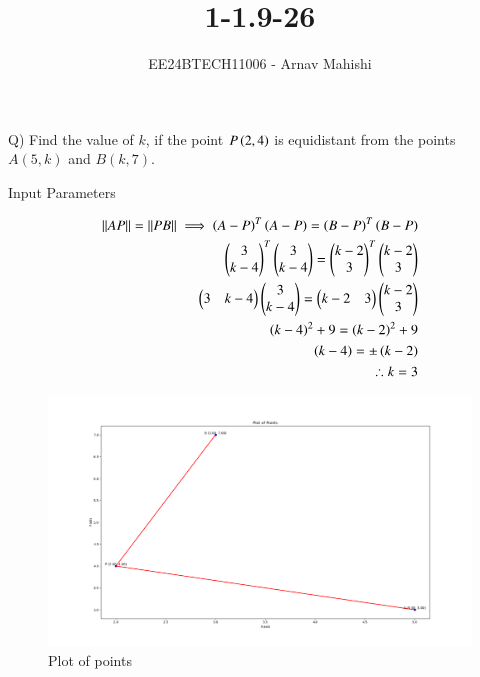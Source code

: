 \documentclass[journal]{IEEEtran}
\begin{document}

\vspace{3cm}

\title{1-1.9-26}
\author{EE24BTECH11006 - Arnav Mahishi}
{\let\newpage\relax\maketitle}

\renewcommand{\thefigure}{\theenumi}
\renewcommand{\thetable}{\theenumi}
\setlength{\intextsep}{10pt} %


\renewcommand{\thetable}{\theenumi}
Q) Find the value of $k$, if the point $P\left(2,4\right)$ is equidistant from the points $A(5,k)$ and $B(k,7)$.\\

\begin{table}[h!]    
  \centering
  
  \caption{Input Parameters}
\end{table}
\begin{align}
\|AP\|=\|PB\| \implies
\left(A-P\right)^T\left(A-P\right)=\left(B-P\right)^T\left(B-P\right)\\
\begin{pmatrix}3\\k-4\end{pmatrix}^T\begin{pmatrix}3\\k-4\end{pmatrix}=\begin{pmatrix}k-2\\3\end{pmatrix}^T\begin{pmatrix}k-2\\3\end{pmatrix}\\
\begin{pmatrix}3&k-4\end{pmatrix}\begin{pmatrix}3\\k-4\end{pmatrix}=\begin{pmatrix}k-2&3\end{pmatrix}\begin{pmatrix}k-2\\3\end{pmatrix}\\
\left(k-4\right)^2+9=\left(k-2\right)^2+9\\
\left(k-4\right)=\pm\left(k-2\right)\\
\therefore k=3
\end{align}
\begin{figure}[h!]
   \centering
   \includegraphics[width=0.7\linewidth]{figs/Figure_1.png}
   \caption{Plot of points}
   \label{stemplot}
\end{figure}
\end{document}
